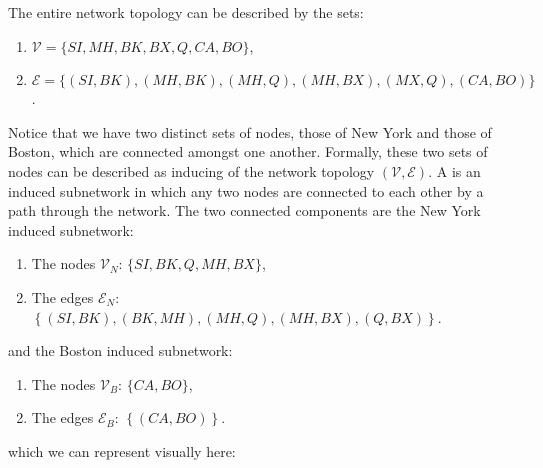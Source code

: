 \documentclass[letterpaper,10pt,english]{jupyterBook}
\begin{document}
\noindent{}

\sphinxAtStartPar
The entire network topology can be described by the sets:
\begin{enumerate}
%
\item {} 
\sphinxAtStartPar
\(\mathcal V = \{SI, MH, BK, BX, Q, CA, BO\}\),

\item {} 
\sphinxAtStartPar
\(\mathcal E = \{(SI, BK), (MH, BK), (MH, Q), (MH, BX), (MX, Q), (CA, BO)\}\).

\end{enumerate}

\sphinxAtStartPar
Notice that we have two distinct sets of nodes, those of New York and those of Boston, which are  connected amongst one another. Formally, these two sets of nodes can be described as inducing  of the network topology \((\mathcal V, \mathcal E)\). A  is an induced subnetwork in which any two nodes are connected to each other by a path through the network. The two connected components are the New York induced subnetwork:
\begin{enumerate}
%
\item {} 
\sphinxAtStartPar
The nodes \(\mathcal V_N\): \(\{SI, BK, Q, MH, BX\}\),

\item {} 
\sphinxAtStartPar
The edges \(\mathcal E_N\): \(\left\{(SI, BK), (BK, MH), (MH, Q), (MH, BX), (Q, BX)\right\}\).

\end{enumerate}

\sphinxAtStartPar
and the Boston induced subnetwork:
\begin{enumerate}
%
\item {} 
\sphinxAtStartPar
The nodes \(\mathcal V_B\): \(\{CA, BO\}\),

\item {} 
\sphinxAtStartPar
The edges \(\mathcal E_B\): \(\left\{(CA, BO)\right\}\).

\end{enumerate}

\sphinxAtStartPar
which we can represent visually here:

\noindent{}
\end{document}
